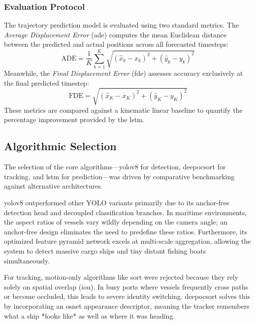 \subsubsection{Evaluation Protocol}
The trajectory prediction model is evaluated using two standard metrics. The \textit{Average Displacement Error} (\gls{ade}) computes the mean Euclidean distance between the predicted and actual positions across all forecasted timesteps:
\begin{equation}
    \text{ADE} = \frac{1}{K} \sum_{k=1}^{K} \sqrt{(\hat{x}_k - x_k)^2 + (\hat{y}_k - y_k)^2}
    \label{eq:LSTM1}
\end{equation}
Meanwhile, the \textit{Final Displacement Error} (\gls{fde}) assesses accuracy exclusively at the final predicted timestep:
\begin{equation}
    \text{FDE} = \sqrt{(\hat{x}_K - x_K)^2 + (\hat{y}_K - y_K)^2}
    \label{eq:LSTM2}
\end{equation}
These metrics are compared against a kinematic linear baseline to quantify the percentage improvement provided by the \gls{lstm}.

\subsection{Algorithmic Selection}

The selection of the core algorithms—\gls{yolov8} for detection, \gls{deepocsort} for tracking, and \gls{lstm} for prediction—was driven by comparative benchmarking against alternative architectures.

\gls{yolov8} outperformed other YOLO variants primarily due to its anchor-free detection head and decoupled classification branches. In maritime environments, the aspect ratios of vessels vary wildly depending on the camera angle; an anchor-free design eliminates the need to predefine these ratios. Furthermore, its optimized feature pyramid network excels at multi-scale aggregation, allowing the system to detect massive cargo ships and tiny distant fishing boats simultaneously.

For tracking, motion-only algorithms like \gls{sort} were rejected because they rely solely on spatial overlap (\gls{iou}). In busy ports where vessels frequently cross paths or become occluded, this leads to severe identity switching. \gls{deepocsort} solves this by incorporating an \gls{osnet} appearance descriptor, meaning the tracker remembers what a ship *looks like* as well as where it was heading. 

